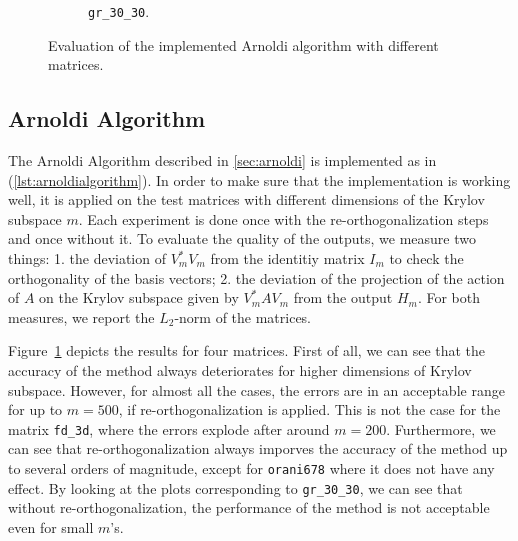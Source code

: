 \begin{figure}[h!]
\begin{subfigure}[b]{0.45\textwidth}
        \caption{\texttt{gr\_30\_30}.}
    \end{subfigure}
    \caption{Evaluation of the implemented Arnoldi algorithm with different matrices.}
    \label{fig:arnoldievaluation}
\end{figure}

\subsection{Arnoldi Algorithm}
The Arnoldi Algorithm described in \autoref{sec:arnoldi} is implemented as in (\autoref{lst:arnoldialgorithm}).
In order to make sure that the implementation is working well, it is applied on the test matrices with different
dimensions of the Krylov subspace $m$. Each experiment is done once with the re-orthogonalization steps and once
without it. To evaluate the quality of the outputs, we measure two things: 1. the deviation of $V_m^* V_m$ from the
identitiy matrix $I_m$ to check the orthogonality of the basis vectors; 2. the deviation of the projection of the
action of $A$ on the Krylov subspace given by $V_m^* A V_m$ from the output $H_m$. For both measures, we report the
$L_2$-norm of the matrices.

Figure~\ref{fig:arnoldievaluation} depicts the results for four matrices. First of all, we can see that the accuracy
of the method always deteriorates for higher dimensions of Krylov subspace. However, for almost all the cases, the
errors are in an acceptable range for up to $m=500$, if re-orthogonalization is applied. This is not the case for the
matrix \texttt{fd\_3d}, where the errors explode after around $m=200$. Furthermore, we can see that re-orthogonalization
always imporves the accuracy of the method up to several orders of magnitude, except for \texttt{orani678} where it does
not have any effect. By looking at the plots corresponding to \texttt{gr\_30\_30}, we can see that without re-orthogonalization,
the performance of the method is not acceptable even for small $m$'s.

